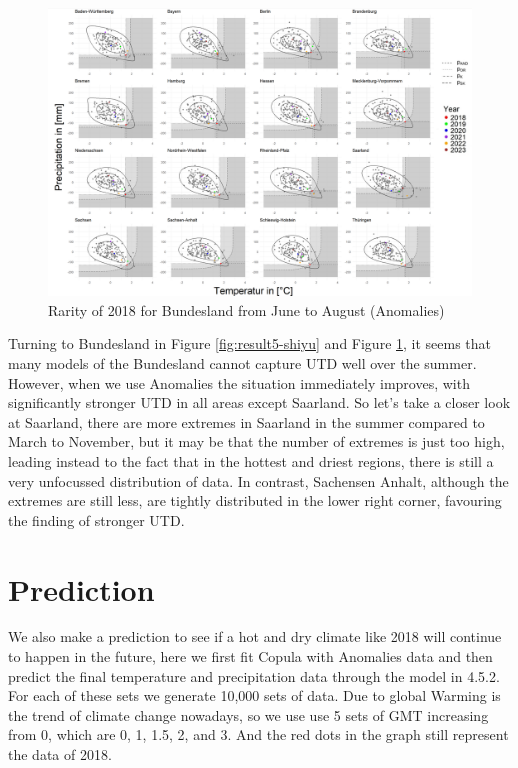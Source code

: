\documentclass[
]{krantz}
\begin{document}
\begin{figure}

{\centering \includegraphics[width=0.8\linewidth]{work/03-compounds/figures/RESULTS/resultJJAA} 

}

\caption{Rarity of 2018 for Bundesland from June to August (Anomalies)}\label{fig:result6-shiyu}
\end{figure}

Turning to Bundesland in Figure \ref{fig:result5-shiyu} and Figure \ref{fig:result6-shiyu}, it seems that many models of the Bundesland cannot capture UTD well over the summer. However, when we use Anomalies the situation immediately improves, with significantly stronger UTD in all areas except Saarland. So let's take a closer look at Saarland, there are more extremes in Saarland in the summer compared to March to November, but it may be that the number of extremes is just too high, leading instead to the fact that in the hottest and driest regions, there is still a very unfocussed distribution of data. In contrast, Sachensen Anhalt, although the extremes are still less, are tightly distributed in the lower right corner, favouring the finding of stronger UTD.

\section{Prediction}\label{prediction}

We also make a prediction to see if a hot and dry climate like 2018 will continue to happen in the future, here we first fit Copula with Anomalies data and then predict the final temperature and precipitation data through the model in 4.5.2. For each of these sets we generate 10,000 sets of data. Due to global Warming is the trend of climate change nowadays, so we use use 5 sets of GMT increasing from 0, which are 0, 1, 1.5, 2, and 3. And the red dots in the graph still represent the data of 2018.
\end{document}
